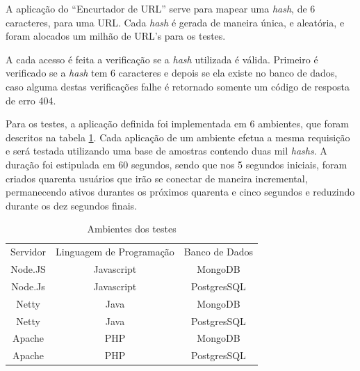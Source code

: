 A aplicação do ``Encurtador de URL'' serve para mapear uma \textit{hash}, de 6 caracteres, para uma URL. Cada \textit{hash} é gerada de maneira única, e aleatória, e foram alocados um milhão de URL's para os testes.

A cada acesso é feita a verificação se a \textit{hash} utilizada é válida.  Primeiro é verificado se a \textit{hash} tem 6 caracteres e depois se ela existe no banco de dados, caso alguma destas verificações falhe é retornado somente um código de  resposta de erro 404. 

Para os testes, a aplicação definida foi implementada em 6 ambientes, que foram descritos na tabela \ref{fig: Ambientes dos testes}. Cada aplicação de um ambiente efetua a mesma requisição e será testada utilizando uma base de amostras contendo duas mil \textit{hashs}. A duração foi estipulada em 60 segundos, sendo que nos  5 segundos iniciais, foram criados quarenta usuários que irão se conectar de maneira incremental, permanecendo ativos durantes os próximos quarenta e cinco segundos e reduzindo durante os dez segundos finais. 

\begin{table}[htb]
\centering
\begin{tabular}{|c|c|c|}
\cline{1-3}
\rowcolor[HTML]{CFCFCF}
Servidor & Linguagem de Programação & Banco de Dados \\ \cline{1-3}
Node.JS  & Javascript               & MongoDB        \\ \cline{1-3}
Node.Js  & Javascript               & PostgresSQL    \\ \cline{1-3}
Netty    & Java                     & MongoDB        \\ \cline{1-3}
Netty    & Java                     & PostgresSQL    \\ \cline{1-3}
Apache   & PHP                      & MongoDB        \\ \cline{1-3}
Apache   & PHP                      & PostgresSQL    \\ \cline{1-3}
\end{tabular}
\caption{Ambientes dos testes \cite{NodejsEMongodb}}
\label{fig: Ambientes dos testes}
\end{table}

